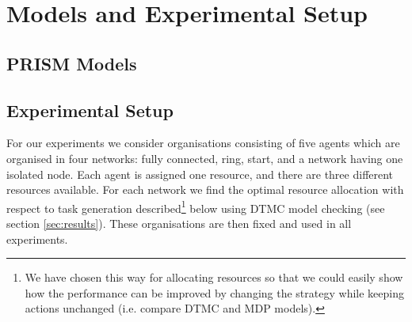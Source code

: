 \documentclass{llncs}
\newcommand{\comment}[1]{{\color{red}{[\sf #1]}}}
\begin{document}
\section{Models and Experimental Setup}

\subsection{PRISM Models}

\comment{give a small example of PRISM models and explain DTMC, MDP and STPG}

\subsection{Experimental Setup}
\label{subsec:exp_set}
For our experiments we consider organisations consisting of five agents which are organised in four networks: fully connected, ring, start, and a network having one isolated node. Each agent is assigned one resource, and there are three different resources available. For each network we find the optimal resource allocation with respect to task generation described\footnote{We have chosen this way for allocating resources so that we could easily show how the performance can be improved by changing the strategy while keeping actions unchanged (i.e. compare DTMC and MDP models).} below using DTMC model checking (see section \ref{sec:results}). These organisations are then fixed and used in all experiments.
\end{document}
